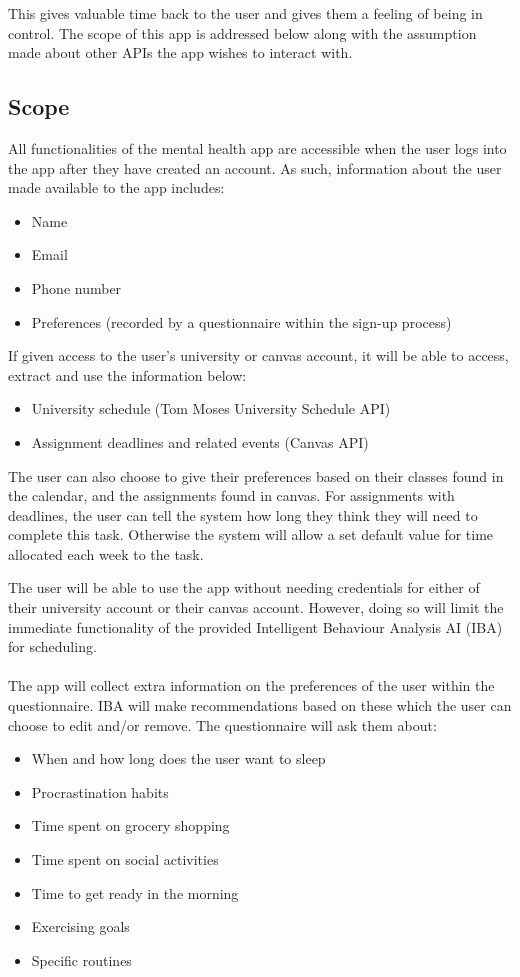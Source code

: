 \documentclass[a4paper,11pt]{article} %
\begin{document}
This gives valuable time back to the user and gives them a feeling of being in control. The scope 
of this app is addressed below along with the assumption made about other APIs the app wishes 
to interact with.

\subsection{Scope}
All functionalities of the mental health app are accessible when the user logs into the app after they 
have created an account. As such, information about the user made available to the app includes:
\begin{itemize}
    \item Name
    \item Email
    \item Phone number
    \item Preferences (recorded by a questionnaire within the sign-up process)
\end{itemize}
\newpage
If given access to the user's university or canvas account, it will be able to access, extract and use 
the information below:
\begin{itemize}
    \item University schedule (Tom Moses University Schedule API)
    \item Assignment deadlines and related events (Canvas API)
\end{itemize}

The user can also choose to give their preferences based on their classes found in the calendar, 
and the assignments found in canvas.
For assignments with deadlines, the user can tell the system how long they think they will need 
to complete this task.
Otherwise the system will allow a set default value for time allocated each week to the task. 

The user will be able to use the app without needing credentials for either of their university account 
or their canvas account. However, doing so will limit the immediate functionality of the provided 
Intelligent Behaviour Analysis AI (IBA) for scheduling.
\\
\\
The app will collect extra information on the preferences of the user within the questionnaire. IBA will make recommendations based on these which the user can choose to edit and/or remove. The questionnaire will ask them about:
\begin{itemize}
    \item When and how long does the user want to sleep
    \item Procrastination habits
    \item Time spent on grocery shopping
    \item Time spent on social activities
    \item Time to get ready in the morning
    \item Exercising goals
    \item Specific routines
\end{itemize}
\end{document}
